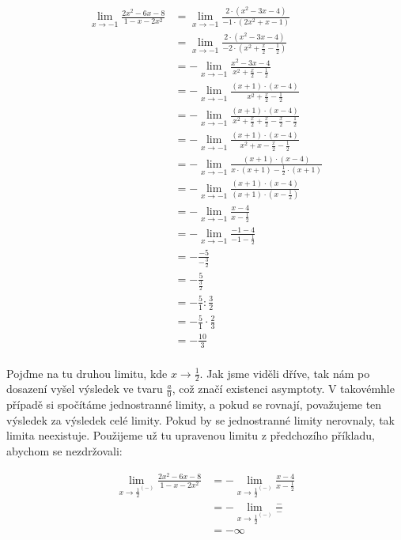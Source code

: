 \documentclass[]{article}
\begin{document}
	\begin{align*}
		\lim_{x \to -1} \frac{2x^2-6x-8}{1-x-2x^2} &= \lim_{x \to -1} \frac{2\cdot(x^2-3x-4)}{-1 \cdot (2x^2 + x - 1)} \\
		&= \lim_{x \to -1} \frac{2\cdot(x^2-3x-4)}{-2 \cdot (x^2 + \frac{x}{2} - \frac{1}{2})} \\
		&= - \lim_{x \to -1} \frac{x^2-3x-4}{x^2 + \frac{x}{2} - \frac{1}{2}} \\
		&= - \lim_{x \to -1} \frac{(x + 1) \cdot (x - 4)}{x^2 + \frac{x}{2} - \frac{1}{2}} \\
		&= - \lim_{x \to -1} \frac{(x + 1) \cdot (x - 4)}{x^2 + \frac{x}{2} + \frac{x}{2} - \frac{x}{2} - \frac{1}{2}} \\
		&= - \lim_{x \to -1} \frac{(x + 1) \cdot (x - 4)}{x^2 + x - \frac{x}{2} - \frac{1}{2}} \\
		&= - \lim_{x \to -1} \frac{(x + 1) \cdot (x - 4)}{x\cdot(x + 1) - \frac{1}{2}\cdot(x + 1)} \\
		&= - \lim_{x \to -1} \frac{(x + 1) \cdot (x - 4)}{(x + 1) \cdot (x - \frac{1}{2})} \\
		&= - \lim_{x \to -1} \frac{x - 4}{x - \frac{1}{2}} \\
		&= - \lim_{x \to -1} \frac{-1 - 4}{-1 - \frac{1}{2}} \\
		&= - \frac{-5}{-\frac{3}{2}} \\
		&= - \frac{5}{\frac{3}{2}} \\
		&= - \frac{5}{1} : \frac{3}{2} \\
		&= - \frac{5}{1} \cdot \frac{2}{3} \\
		&= - \frac{10}{3}\\
	\end{align*}
	
	\pagebreak
	Pojďme na tu druhou limitu, kde $x \to \frac{1}{2}$. Jak jsme viděli dříve, tak nám po dosazení vyšel výsledek ve tvaru $\frac{a}{0}$, což značí existenci asymptoty. V takovémhle případě si spočítáme jednostranné limity, a pokud se rovnají, považujeme ten výsledek za výsledek celé limity. Pokud by se jednostranné limity nerovnaly, tak limita neexistuje. Použijeme už tu upravenou limitu z předchozího příkladu, abychom se nezdržovali:
	
	\begin{align*}
		\lim_{x \to \frac{1}{2}^{(-)}} \frac{2x^2-6x-8}{1-x-2x^2} &= - \lim_{x \to \frac{1}{2}^{(-)}} \frac{x - 4}{x - \frac{1}{2}} \\
		&= - \lim_{x \to \frac{1}{2}^{(-)}} \frac{-}{-} \\
		&= - \infty
	\end{align*}
	
\end{document}
